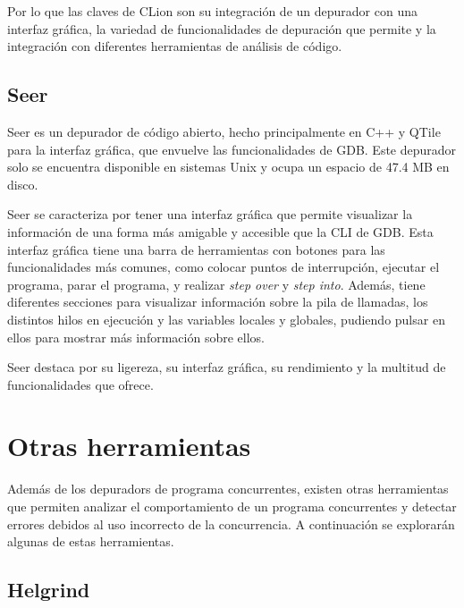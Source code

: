 Por lo que las claves de CLion son su integración de un \gls{depurador} con una \gls{interfaz gráfica}, la variedad de funcionalidades de depuración que permite y la integración con diferentes herramientas de análisis de código.


\subsection{Seer}{\label{subsec:seer}}
Seer es un depurador de \gls{código abierto}, hecho principalmente en C++ y QTile para la \gls{interfaz gráfica}, que envuelve las funcionalidades de GDB. Este \gls{depurador} solo se encuentra disponible en sistemas Unix y ocupa un espacio de 47.4 MB en disco. 

Seer se caracteriza por tener una \gls{interfaz gráfica} que permite visualizar la información de una forma más amigable y accesible que la \gls{CLI} de GDB. Esta interfaz gráfica tiene una barra de herramientas con botones para las funcionalidades más comunes, como colocar puntos de interrupción, ejecutar el programa, parar el programa, y realizar \textit{\gls{step over}} y \textit{\gls{step into}}. Además, tiene diferentes secciones para visualizar información sobre la pila de llamadas, los distintos \glspl{hilo} en ejecución y las variables locales y globales, pudiendo pulsar en ellos para mostrar más información sobre ellos.

Seer destaca por su ligereza, su \gls{interfaz gráfica}, su rendimiento y la multitud de funcionalidades que ofrece.


\section{Otras herramientas}\label{sec:herramientas}

Además de los \glspl{depurador} de \glspl{programa concurrente}, existen otras herramientas que permiten analizar el comportamiento de un \glspl{programa concurrente} y detectar errores debidos al uso incorrecto de la \gls{concurrencia}. A continuación se explorarán algunas de estas herramientas.

\subsection{Helgrind}{\label{subsec:helgrind}}

